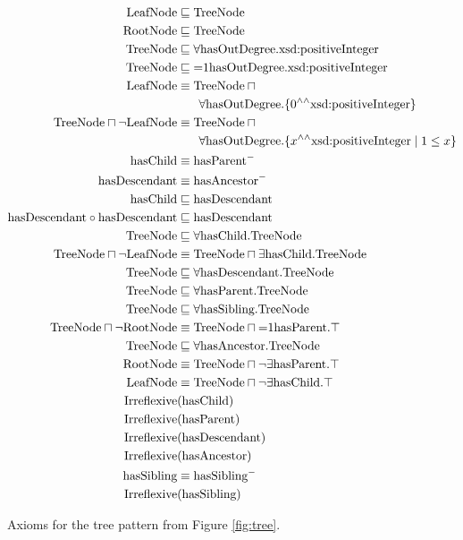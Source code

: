 \begin{figure}[t]\small
\begin{align}
\text{LeafNode} &\sqsubseteq \text{TreeNode}\label{ax1}\\
\text{RootNode} &\sqsubseteq \text{TreeNode}\\
\text{TreeNode} &\sqsubseteq \forall\text{hasOutDegree}.\text{xsd:positiveInteger}\\
\text{TreeNode} &\sqsubseteq \mathord{=}1\text{hasOutDegree}.\text{xsd:positiveInteger}\\
\text{LeafNode} &\equiv \text{TreeNode} \sqcap \phantom{x}\notag\\ &\phantom{\equiv} \quad\forall\text{hasOutDegree}.\{0^{\wedge\wedge}\text{xsd:positiveInteger}\}\\
\text{TreeNode} \sqcap \neg\text{LeafNode} &\equiv \text{TreeNode} \sqcap \phantom{x} \notag\\ &\phantom{\equiv}\quad\forall\text{hasOutDegree}.\{x^{\wedge\wedge}\text{xsd:positiveInteger}\mid 1\leq x\}\label{ax6}\\
\text{hasChild} &\equiv \text{hasParent}^-\\
\text{hasDescendant} &\equiv \text{hasAncestor}^-\\
\text{hasChild} &\sqsubseteq \text{hasDescendant}\\
\text{hasDescendant} \circ \text{hasDescendant} &\sqsubseteq \text{hasDescendant}\\
\text{TreeNode} &\sqsubseteq \forall\text{hasChild}.\text{TreeNode}\\
\text{TreeNode} \sqcap \neg \text{LeafNode} &\equiv \text{TreeNode} \sqcap \exists \text{hasChild}.\text{TreeNode}\\
\text{TreeNode} &\sqsubseteq \forall\text{hasDescendant}.\text{TreeNode}\\
\text{TreeNode} &\sqsubseteq \forall\text{hasParent}.\text{TreeNode}\\
\text{TreeNode} &\sqsubseteq \forall\text{hasSibling}.\text{TreeNode}\\
\text{TreeNode} \sqcap \neg \text{RootNode} &\equiv \text{TreeNode} \sqcap \mathord{=} 1\text{hasParent}.\top\\
\text{TreeNode} &\sqsubseteq \forall\text{hasAncestor}.\text{TreeNode}\\
\text{RootNode} &\equiv \text{TreeNode} \sqcap \neg \exists\text{hasParent}.\top\\
\text{LeafNode} &\equiv \text{TreeNode} \sqcap \neg \exists\text{hasChild}.\top\\
\text{Irreflexive}&(\text{hasChild})\\
\text{Irreflexive}&(\text{hasParent})\\
\text{Irreflexive}&(\text{hasDescendant})\label{ax25}\\
\text{Irreflexive}&(\text{hasAncestor})\label{ax26}\\
\text{hasSibling} &\equiv \text{hasSibling}^-\\
\text{Irreflexive}&(\text{hasSibling})
\end{align}
\caption{Axioms for the tree pattern from Figure \ref{fig:tree}.}\label{fig:tree-axioms}
\label{figure:tree}
\end{figure}

